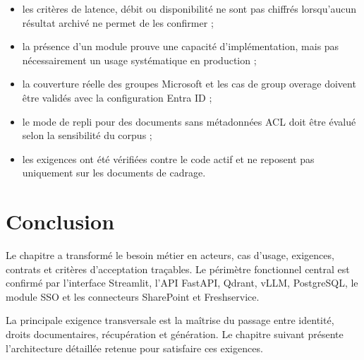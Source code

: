 \begin{itemize}
    \item les critères de latence, débit ou disponibilité ne sont pas chiffrés lorsqu'aucun résultat archivé ne permet de les confirmer ;
    \item la présence d'un module prouve une capacité d'implémentation, mais pas nécessairement un usage systématique en production ;
    \item la couverture réelle des groupes Microsoft et les cas de group overage doivent être validés avec la configuration Entra ID ;
    \item le mode de repli pour des documents sans métadonnées ACL doit être évalué selon la sensibilité du corpus ;
    \item les exigences ont été vérifiées contre le code actif et ne reposent pas uniquement sur les documents de cadrage.
\end{itemize}

\section{Conclusion}

Le chapitre a transformé le besoin métier en acteurs, cas d'usage, exigences, contrats et critères d'acceptation traçables. Le périmètre fonctionnel central est confirmé par l'interface Streamlit, l'API FastAPI, Qdrant, vLLM, PostgreSQL, le module SSO et les connecteurs SharePoint et Freshservice.

La principale exigence transversale est la maîtrise du passage entre identité, droits documentaires, récupération et génération. Le chapitre suivant présente l'architecture détaillée retenue pour satisfaire ces exigences.

